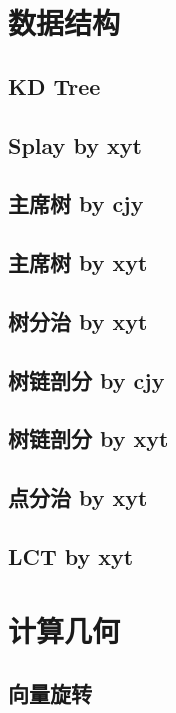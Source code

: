 \documentclass[11pt]{article}
\begin{document}
	\section{数据结构}
		\subsection{KD Tree}
		
		\subsection{Splay by xyt}
		
		\subsection{主席树 by cjy}
		
		\subsection{主席树 by xyt}
		
		\subsection{树分治 by xyt}
		
		\subsection{树链剖分 by cjy}
		
		\subsection{树链剖分 by xyt}
		
		\subsection{点分治 by xyt}
		
		\subsection{LCT by xyt}
		
	\section{计算几何}
		\subsection{向量旋转}
		
\end{document}
